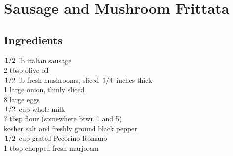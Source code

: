 \documentclass{article}
\begin{document}
\newcommand{\slfrac}[2]{\left.#1\middle/#2\right.}
\newcommand{\degree}{\ensuremath{^\circ}}

\section*{Sausage and Mushroom Frittata}



\subsection*{Ingredients}
$\slfrac{1}{2}$ lb italian sausage\\
2 tbsp olive oil\\
$\slfrac{1}{2}$ lb fresh mushrooms, sliced $\slfrac{1}{4}$ inches thick\\
1 large onion, thinly sliced\\
8 large eggs\\
$\slfrac{1}{2}$ cup whole milk\\
? tbsp flour (somewhere btwn 1 and 5)\\
kosher salt and freshly ground black pepper\\
$\slfrac{1}{2}$ cup grated Pecorino Romano\\
1 tbsp chopped fresh marjoram\\
\end{document}
